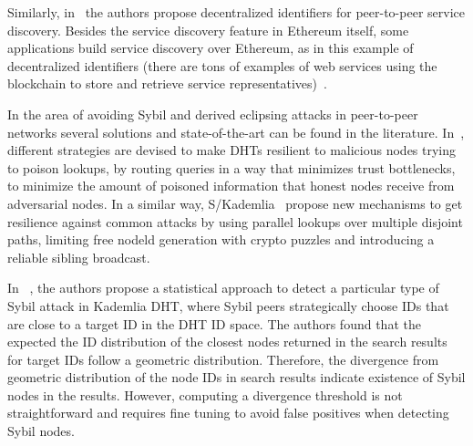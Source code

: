 Similarly, in~\cite{farmer2021decentralized} the authors propose decentralized identifiers for peer-to-peer service discovery.
Besides the service discovery feature in Ethereum itself, some applications build service discovery over Ethereum, as in this example of decentralized identifiers (there are tons of examples of web services using the blockchain to store and retrieve service representatives)~\cite{keizer2021flock}.








In the area of avoiding Sybil and derived eclipsing attacks in peer-to-peer networks several solutions and state-of-the-art can be found in the literature.
In~\cite{danezis2005sybil}, different strategies are devised to make DHTs resilient to malicious nodes trying to poison lookups, by routing queries in a way that minimizes trust bottlenecks, to minimize the amount of poisoned information that honest nodes receive from adversarial nodes.
In a similar way, S/Kademlia~\cite{skad} propose new mechanisms to get resilience against common attacks by using parallel lookups over multiple disjoint paths, limiting free nodeld generation with crypto puzzles and introducing a reliable sibling broadcast.

In ~\cite{cholez2010efficient}, the authors propose a statistical approach to detect a particular type of Sybil attack in  Kademlia DHT, where Sybil peers strategically choose IDs that are close to a target ID in the DHT ID space.
The authors found that the expected the ID distribution of the closest nodes returned in the search results for target IDs follow a geometric distribution. Therefore, the divergence from geometric distribution of the node IDs in search results indicate existence of Sybil nodes in the results. However, computing a divergence threshold is not straightforward and requires fine tuning to avoid false positives when detecting Sybil nodes.

